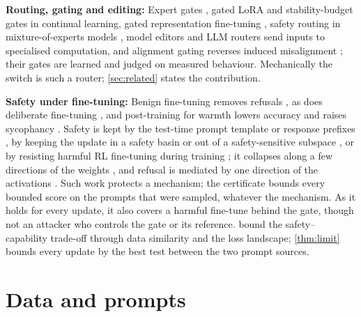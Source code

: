 \documentclass{article}
\theoremstyle{plain}
\theoremstyle{definition}
\theoremstyle{remark}
\begin{document}
\textbf{Routing, gating and editing:} Expert gates \citep{aljundi2017expertgate}, gated LoRA \citep{liang2025gainlora}
and stability-budget gates \citep{hoy2025stable} in continual learning, gated representation fine-tuning
\citep{zeng2025context}, safety routing in mixture-of-experts models \citep{kim2025defending}, model editors
\citep{mitchell2022serac} and LLM routers \citep{ong2024routellm} send inputs to specialised computation, and alignment
gating reverses induced misalignment \citep{wang2026emergent}; their gates are learned and judged on measured behaviour.
Mechanically the switch is such a router; \cref{sec:related} states the contribution.

\textbf{Safety under fine-tuning:} Benign fine-tuning removes refusals \citep{qi2024finetuning,huang2024harmful}, as
does deliberate fine-tuning \citep{zhan2024removing}, and post-training for warmth lowers accuracy and raises
sycophancy \citep{ibrahim2026warm}. Safety is kept by the test-time prompt template or response prefixes
\citep{lyu2024keeping,hahm2026unintended}, by keeping the update in a safety basin or out of a safety-sensitive
subspace \citep{yang2025asft,zhang2025guardrail}, or by resisting harmful RL fine-tuning during training
\citep{feng2025token,cao2025fight}; it collapses along a few directions of the weights \citep{springer2026geometry}, and
refusal is mediated by one direction of the activations \citep{arditi2024refusal}. Such work protects a mechanism; the
certificate bounds every bounded score on the prompts that were sampled, whatever the mechanism. As it holds for
every update, it also covers a harmful fine-tune behind the gate, though not an attacker who controls the gate or its
reference. \citet{chen2025fundamental} bound the safety--capability trade-off through data similarity and the loss
landscape; \cref{thm:limit} bounds every update by the best test between the two prompt sources.

\section{Data and prompts}
\label{app:data}
\end{document}
